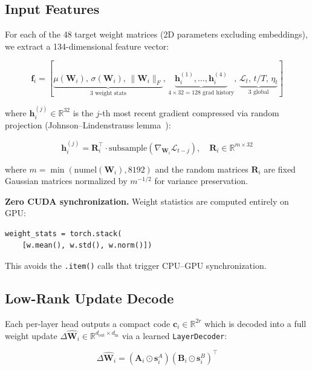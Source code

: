 \documentclass[conference]{IEEEtran}
\begin{document}
\subsection{Input Features}

For each of the 48 target weight matrices (2D parameters excluding embeddings), we extract a 134-dimensional feature vector:

\begin{equation}
\mathbf{f}_i = \left[\underbrace{\mu(\mathbf{W}_i),\, \sigma(\mathbf{W}_i),\, \|\mathbf{W}_i\|_F}_{3\text{ weight stats}},\, \underbrace{\mathbf{h}_i^{(1)}, \ldots, \mathbf{h}_i^{(4)}}_{4 \times 32 = 128\text{ grad history}},\, \underbrace{\mathcal{L}_t,\, t/T,\, \eta_t}_{3\text{ global}}\right]
\label{eq:features}
\end{equation}

\noindent where $\mathbf{h}_i^{(j)} \in \mathbb{R}^{32}$ is the $j$-th most recent gradient compressed via random projection (Johnson--Lindenstrauss lemma~\cite{johnson1984extensions}):

\begin{equation}
\mathbf{h}_i^{(j)} = \mathbf{R}_i^\top \cdot \mathrm{subsample}(\nabla_{\mathbf{W}_i} \mathcal{L}_{t-j}), \quad \mathbf{R}_i \in \mathbb{R}^{m \times 32}
\label{eq:jl_proj}
\end{equation}

where $m = \min(\mathrm{numel}(\mathbf{W}_i), 8192)$ and the random matrices $\mathbf{R}_i$ are fixed Gaussian matrices normalized by $m^{-1/2}$ for variance preservation.

\noindent\textbf{Zero CUDA synchronization.} Weight statistics are computed entirely on GPU:
\begin{verbatim}
weight_stats = torch.stack(
    [w.mean(), w.std(), w.norm()])
\end{verbatim}
This avoids the \texttt{.item()} calls that trigger CPU--GPU synchronization.

\subsection{Low-Rank Update Decode}

Each per-layer head outputs a compact code $\mathbf{c}_i \in \mathbb{R}^{2r}$ which is decoded into a full weight update $\Delta\hat{\mathbf{W}}_i \in \mathbb{R}^{d_\mathrm{out} \times d_\mathrm{in}}$ via a learned \texttt{LayerDecoder}:

\begin{equation}
\Delta\hat{\mathbf{W}}_i = \left(\mathbf{A}_i \odot \mathbf{s}_i^A\right) \left(\mathbf{B}_i \odot \mathbf{s}_i^B\right)^\top
\label{eq:decode}
\end{equation}
\end{document}
